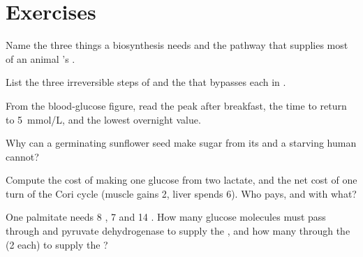 \section{Exercises}

\begin{exercise}[$\star$]\label{exo:b1:biosyntheses-integration:1}
Name the three things a biosynthesis needs and the pathway that
supplies most of an animal 's .
\end{exercise}

\begin{exercise}[$\star$]\label{exo:b1:biosyntheses-integration:2}
List the three irreversible steps of  and the  that
bypasses each in .
\end{exercise}

\begin{exercise}[$\star$]\label{exo:b1:biosyntheses-integration:3}
From the blood-glucose figure, read the peak after breakfast, the
time to return to \qty{5}{mmol/L}, and the lowest overnight value.
\end{exercise}

\begin{exercise}[$\star$]\label{exo:b1:biosyntheses-integration:4}
Why can a germinating sunflower seed make sugar from its  and a
starving human cannot?
\end{exercise}

\begin{exercise}[$\star\star$]\label{exo:b1:biosyntheses-integration:5}
Compute the  cost of making one glucose from two lactate, and the
net cost of one turn of the Cori cycle (muscle gains 2, liver spends 6).
Who pays, and with what?
\end{exercise}

\begin{exercise}[$\star\star$]\label{exo:b1:biosyntheses-integration:6}
One palmitate needs 8 , 7  and 14 . How many glucose
molecules must pass through  and pyruvate dehydrogenase to
supply the , and how many through the  (2  each) to supply the ?
\end{exercise}

